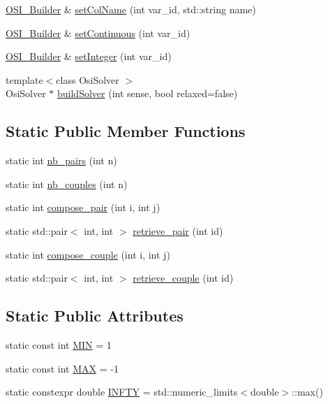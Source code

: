 \begin{DoxyCompactItemize}
\item 
\hyperlink{class_o_s_i___builder}{O\+S\+I\+\_\+\+Builder} \& \hyperlink{class_o_s_i___builder_acb409a7ad7615d995af3f1c5e56417e7}{set\+Col\+Name} (int var\+\_\+id, std\+::string name)
\item 
\hyperlink{class_o_s_i___builder}{O\+S\+I\+\_\+\+Builder} \& \hyperlink{class_o_s_i___builder_abb4c8d13d5a3639ff22d9ec10960878c}{set\+Continuous} (int var\+\_\+id)
\item 
\hyperlink{class_o_s_i___builder}{O\+S\+I\+\_\+\+Builder} \& \hyperlink{class_o_s_i___builder_ab5da16db7740e228da63e4b58ab2069e}{set\+Integer} (int var\+\_\+id)
\item 
{\footnotesize template$<$class Osi\+Solver $>$ }\\Osi\+Solver $\ast$ \hyperlink{class_o_s_i___builder_a25b48f1859bad98a9c1545d789e3310c}{build\+Solver} (int sense, bool relaxed=false)
\end{DoxyCompactItemize}
\subsection*{Static Public Member Functions}
\begin{DoxyCompactItemize}
\item 
static int \hyperlink{class_o_s_i___builder_a332430c1559d3f57e556fed565d09d55}{nb\+\_\+pairs} (int n)
\item 
static int \hyperlink{class_o_s_i___builder_a073d6abeb8bd32a32d67ca1685e06b12}{nb\+\_\+couples} (int n)
\item 
static int \hyperlink{class_o_s_i___builder_adf04717a67167471083eec6815ebadcf}{compose\+\_\+pair} (int i, int j)
\item 
static std\+::pair$<$ int, int $>$ \hyperlink{class_o_s_i___builder_aa876adecee1af9bb840d434de1e78980}{retrieve\+\_\+pair} (int id)
\item 
static int \hyperlink{class_o_s_i___builder_a20bf8723af96f5a4f6b97a88526ae8bc}{compose\+\_\+couple} (int i, int j)
\item 
static std\+::pair$<$ int, int $>$ \hyperlink{class_o_s_i___builder_a47117c9ae73021710fd1ed695bb5d9e5}{retrieve\+\_\+couple} (int id)
\end{DoxyCompactItemize}
\subsection*{Static Public Attributes}
\begin{DoxyCompactItemize}
\item 
static const int \hyperlink{class_o_s_i___builder_a3af4e2722a30807c440a3a243a3732f8}{M\+IN} = 1
\item 
static const int \hyperlink{class_o_s_i___builder_accf4032198acbf182e0d86af1c002c6e}{M\+AX} = -\/1
\item 
static constexpr double \hyperlink{class_o_s_i___builder_ada1254828d2dd95d33cc28418270f88d}{I\+N\+F\+TY} = std\+::numeric\+\_\+limits$<$double$>$\+::max()
\end{DoxyCompactItemize}


